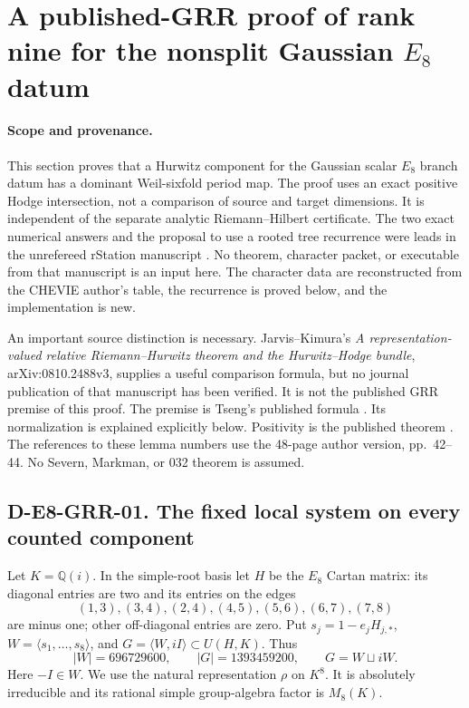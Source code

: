 \section{A published-GRR proof of rank nine for the nonsplit Gaussian $E_8$ datum}
\label{sec:e8-grr}

\paragraph{Scope and provenance.}
This section proves that a Hurwitz component for the Gaussian scalar
$E_8$ branch datum has a dominant Weil-sixfold period map.  The proof
uses an exact positive Hodge intersection, not a comparison of source
and target dimensions.  It is independent of the separate analytic
Riemann--Hilbert certificate.  The two exact numerical answers and the
proposal to use a rooted tree recurrence were leads in the unrefereed
rStation manuscript \cite{E8GRR:lead66}.  No theorem, character packet,
or executable from that manuscript is an input here.  The character
data are reconstructed from the CHEVIE author's table, the recurrence
is proved below, and the implementation is new.

An important source distinction is necessary.  Jarvis--Kimura's
\emph{A representation-valued relative Riemann--Hurwitz theorem and
the Hurwitz--Hodge bundle}, arXiv:0810.2488v3, supplies a useful
comparison formula, but no journal publication of that manuscript
has been verified.  It is not the published GRR premise of this proof.
The premise is Tseng's published formula \cite[\S7.3, especially
(7.3.6.1) and (7.3.7.2), pp.~60--64]{E8GRR:Tseng}.  Its normalization
is explained explicitly below.  Positivity is the published theorem
\cite[Lemma~6.17, with its proof and Lemma~6.15]{E8GRR:BBT}.
The references to these lemma numbers use the 48-page author version,
pp.~42--44.  No Severn, Markman, or 032 theorem is assumed.

\subsection*{D-E8-GRR-01. The fixed local system on every counted component}

Let $K=\mathbb Q(i)$.  In the simple-root basis let $H$ be the $E_8$
Cartan matrix: its diagonal entries are two and its entries on the
edges
\[
 (1,3),(3,4),(2,4),(4,5),(5,6),(6,7),(7,8)
\]
are minus one; other off-diagonal entries are zero.  Put
$s_j=1-e_jH_{j,*}$, $W=\langle s_1,\ldots,s_8\rangle$, and
$G=\langle W,iI\rangle\subset U(H,K)$.  Thus
\[
 |W|=696729600,\qquad |G|=1393459200,\qquad G=W\sqcup iW.
\]
Here $-I\in W$.  We use the natural representation $\rho$ on $K^8$.
It is absolutely irreducible and its rational simple group-algebra
factor is $M_8(K)$.

